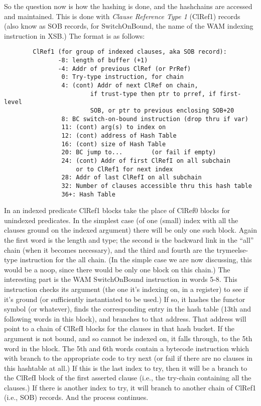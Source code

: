 \documentclass[11pt]{article}
\begin{document}
So the question now is how the hashing is done, and the hashchains are
accessed and maintained.  This is done with {\em Clause Reference Type
1} (ClRef1) records (also know as SOB records, for SwitchOnBound, the
name of the WAM indexing instruction in XSB.)  The format is as
follows:
\begin{verbatim}
        ClRef1 (for group of indexed clauses, aka SOB record):
               -8: length of buffer (+1)
               -4: Addr of previous ClRef (or PrRef)
                0: Try-type instruction, for chain
                4: (cont) Addr of next ClRef on chain,
                        if trust-type then ptr to prref, if first-level
                        SOB, or ptr to previous enclosing SOB+20  
                8: BC switch-on-bound instruction (drop thru if var)
                11: (cont) arg(s) to index on
                12: (cont) address of Hash Table
                16: (cont) size of Hash Table
                20: BC jump to...        (or fail if empty)
                24: (cont) Addr of first ClRefI on all subchain
                    or to ClRef1 for next index
                28: Addr of last ClRefI on all subchain
                32: Number of clauses accessible thru this hash table
                36+: Hash Table
\end{verbatim}

In an indexed predicate ClRef1 blocks take the place of ClRef0 blocks
for unindexed predicates.  In the simplest case (of one (small) index
with all the clauses ground on the indexed argument) there will be
only one such block.  Again the first word is the length and type; the
second is the backward link in the ``all'' chain (when it becomes
necessary), and the third and fourth are the trymeelse-type
instruction for the all chain.  (In the simple case we are now
discussing, this would be a noop, since there would be only one block
on this chain.)  The interesting part is the WAM SwitchOnBound
instruction in words 5-8.  This instruction checks its argument (the
one it's indexing on, in a register) to see if it's ground (or
sufficiently instantiated to be used.)  If so, it hashes the functor
symbol (or whatever), finds the corresponding entry in the hash table
(13th and following words in this block), and branches to that
address.  That address will point to a chain of ClRefI blocks for the
clauses in that hash bucket.  If the argument is not bound, and so
cannot be indexed on, it falls through, to the 5th word in the block.
The 5th and 6th words contain a bytecode instruction which with branch
to the appropriate code to try next (or fail if there are no clauses
in this hashtable at all.)  If this is the last index to try, then it
will be a branch to the ClRefI block of the first asserted clause
(i.e., the try-chain containing all the clauses.)  If there is another
index to try, it will branch to another chain of ClRef1 (i.e., SOB)
records.  And the process continues.
\end{document}
